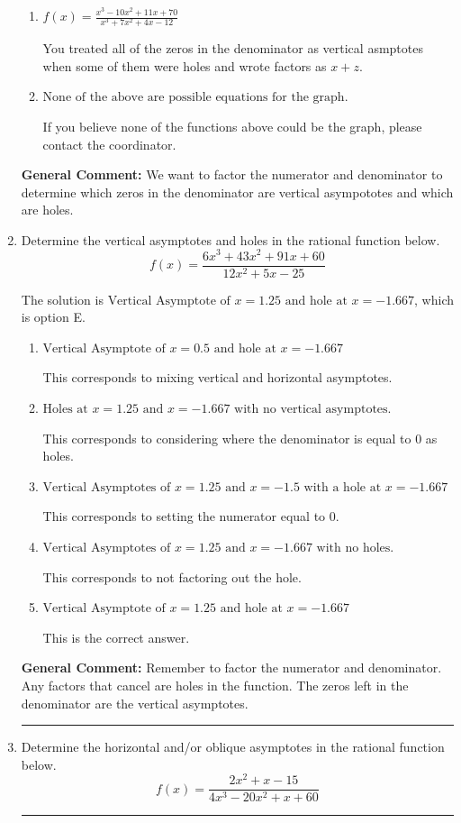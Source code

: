 \documentclass{extbook}[14pt]
\newcommand{\litem}[1]{\item #1

\rule{\textwidth}{0.4pt}}
\begin{document}
\begin{enumerate}
{\begin{enumerate}[label=\Alph*.]
Remember that factors are written as $x-z$. For example, the zero $x=-1$ corresponds to the factor $x-(-1)$.
\item \( f(x)=\frac{x^{3} -10 x^{2} +11 x + 70}{x^{3} +7 x^{2} +4 x -12} \)

You treated all of the zeros in the denominator as vertical asmptotes when some of them were holes and wrote factors as $x+z$.
\item \( \text{None of the above are possible equations for the graph.} \)

If you believe none of the functions above could be the graph, please contact the coordinator.
\end{enumerate}

\textbf{General Comment:} We want to factor the numerator and denominator to determine which zeros in the denominator are vertical asympototes and which are holes.
}
\litem{
Determine the vertical asymptotes and holes in the rational function below.
\[ f(x) = \frac{6x^{3} +43 x^{2} +91 x + 60}{12x^{2} +5 x -25} \]

The solution is \( \text{Vertical Asymptote of } x = 1.25 \text{ and hole at } x = -1.667 \), which is option E.\begin{enumerate}[label=\Alph*.]
\item \( \text{Vertical Asymptote of } x = 0.5 \text{ and hole at } x = -1.667 \)

This corresponds to mixing vertical and horizontal asymptotes.
\item \( \text{Holes at } x = 1.25 \text{ and } x = -1.667 \text{ with no vertical asymptotes.} \)

This corresponds to considering where the denominator is equal to 0 as holes.
\item \( \text{Vertical Asymptotes of } x = 1.25 \text{ and } x = -1.5 \text{ with a hole at } x = -1.667 \)

This corresponds to setting the numerator equal to 0.
\item \( \text{Vertical Asymptotes of } x = 1.25 \text{ and } x = -1.667 \text{ with no holes.} \)

This corresponds to not factoring out the hole.
\item \( \text{Vertical Asymptote of } x = 1.25 \text{ and hole at } x = -1.667 \)

This is the correct answer.
\end{enumerate}

\textbf{General Comment:} Remember to factor the numerator and denominator. Any factors that cancel are holes in the function. The zeros left in the denominator are the vertical asymptotes.
}
\litem{
Determine the horizontal and/or oblique asymptotes in the rational function below.
\[ f(x) = \frac{2x^{2} +x -15}{4x^{3} -20 x^{2} +x + 60} \]

}
\end{enumerate}
\end{document}
